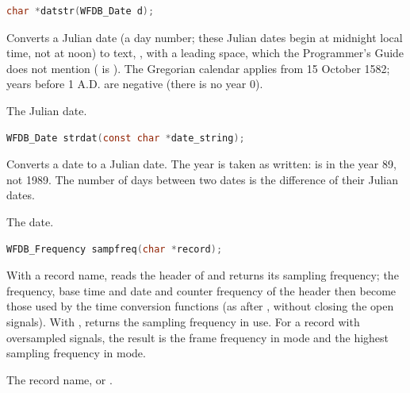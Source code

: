 \begin{lstlisting}[language=C,style=signature]
char *datstr(WFDB_Date d);
\end{lstlisting}
Converts a Julian date (a day number; these Julian dates begin at midnight
local time, not at noon) to text, , with a leading space,
which the Programmer's Guide does not mention ( is
). The Gregorian calendar applies from 15 October 1582;
years before 1 A.D. are negative (there is no year 0).
\begin{params}
\item[d] The Julian date.
\end{params}

\begin{lstlisting}[language=C,style=signature]
WFDB_Date strdat(const char *date_string);
\end{lstlisting}
Converts a date  to a Julian date. The year is taken as
written:  is in the year 89, not 1989. The number of days
between two dates is the difference of their Julian dates.
\begin{params}
\item[date\_string] The date.
\end{params}

\begin{lstlisting}[language=C,style=signature]
WFDB_Frequency sampfreq(char *record);
\end{lstlisting}
With a record name, reads the header of  and returns its
sampling frequency; the frequency, base time and date and counter frequency
of the header then become those used by the time conversion functions (as
after , without closing the open signals).
With , returns the sampling frequency in use. For a record with
oversampled signals, the result is the frame frequency in
 mode and the highest sampling frequency in
 mode.
\begin{params}
\item[record] The record name, or .
\end{params}

